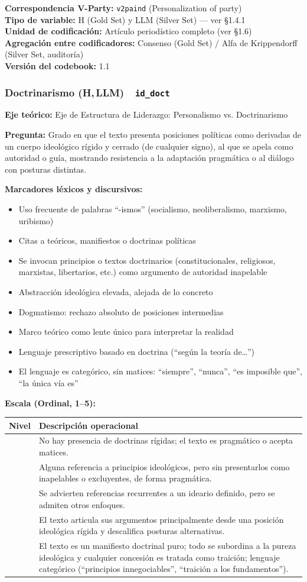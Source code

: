 \documentclass[11pt,letterpaper]{article}
\newcommand{\metaficha}[1]{%
  \par\smallskip\noindent\footnotesize\color{gris}%
  \textbf{Correspondencia V-Party:} #1\\
  \textbf{Tipo de variable:} H (Gold Set) y LLM (Silver Set) — ver §1.4.1\\
  \textbf{Unidad de codificación:} Artículo periodístico completo (ver §1.6)\\
  \textbf{Agregación entre codificadores:} Consenso (Gold Set) / Alfa de Krippendorff (Silver Set, auditoría)\\
  \textbf{Versión del codebook:} 1.1\par\normalsize\color{black}\medskip}
\newcommand{\dimtitulo}[2]{\subsubsection*{#1 \normalfont\small\color{gris}(H,\,LLM)\ \ \texttt{#2}}%
  \addcontentsline{toc}{subsubsection}{#1}}
\begin{document}
\metaficha{\texttt{v2paind} (Personalization of party)}

\dimtitulo{Doctrinarismo}{id\_doct}
\textbf{Eje teórico:} Eje de Estructura de Liderazgo: Personalismo vs. Doctrinarismo

\textbf{Pregunta:} Grado en que el texto presenta posiciones políticas como derivadas de un cuerpo ideológico
rígido y cerrado (de cualquier signo), al que se apela como autoridad o guía, mostrando resistencia a la
adaptación pragmática o al diálogo con posturas distintas.

\textbf{Marcadores léxicos y discursivos:}
\begin{itemize}
\item Uso frecuente de palabras “-ismos” (socialismo, neoliberalismo, marxismo, uribismo)
\item Citas a teóricos, manifiestos o doctrinas políticas
\item Se invocan principios o textos doctrinarios (constitucionales, religiosos, marxistas, libertarios, etc.)
como argumento de autoridad inapelable
\item Abstracción ideológica elevada, alejada de lo concreto
\item Dogmatismo: rechazo absoluto de posiciones intermedias
\item Marco teórico como lente único para interpretar la realidad
\item Lenguaje prescriptivo basado en doctrina (“según la teoría de…”)
\item El lenguaje es categórico, sin matices: “siempre”, “nunca”, “es imposible que”, “la única vía es”
\end{itemize}

\textbf{Escala (Ordinal, 1–5):}
\begin{longtable}{@{}>{\centering\arraybackslash}p{1.1cm}p{14.3cm}@{}}
\toprule \textbf{Nivel} & \textbf{Descripción operacional}\\ \midrule\endhead
1 & No hay presencia de doctrinas rígidas; el texto es pragmático o acepta matices.\\
\addlinespace
2 & Alguna referencia a principios ideológicos, pero sin presentarlos como inapelables o excluyentes, de
forma pragmática.\\
\addlinespace
3 & Se advierten referencias recurrentes a un ideario definido, pero se admiten otros enfoques.\\
\addlinespace
4 & El texto articula sus argumentos principalmente desde una posición ideológica rígida y descalifica
posturas alternativas.\\
\addlinespace
5 & El texto es un manifiesto doctrinal puro; todo se subordina a la pureza ideológica y cualquier concesión
es tratada como traición; lenguaje categórico (“principios innegociables”, “traición a los fundamentos”).\\
\bottomrule
\end{longtable}
\end{document}
